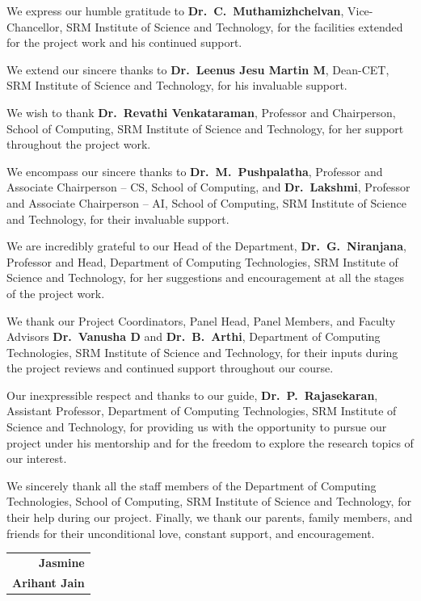\documentclass[12pt,a4paper,oneside]{report}
\begin{document}
\begin{singlespace}
We express our humble gratitude to \textbf{Dr.\ C.\ Muthamizhchelvan}, Vice-Chancellor, SRM Institute of Science and Technology, for the facilities extended for the project work and his continued support.

We extend our sincere thanks to \textbf{Dr.\ Leenus Jesu Martin M}, Dean-CET, SRM Institute of Science and Technology, for his invaluable support.

We wish to thank \textbf{Dr.\ Revathi Venkataraman}, Professor and Chairperson, School of Computing, SRM Institute of Science and Technology, for her support throughout the project work.

We encompass our sincere thanks to \textbf{Dr.\ M.\ Pushpalatha}, Professor and Associate Chairperson -- CS, School of Computing, and \textbf{Dr.\ Lakshmi}, Professor and Associate Chairperson -- AI, School of Computing, SRM Institute of Science and Technology, for their invaluable support.

We are incredibly grateful to our Head of the Department, \textbf{Dr.\ G.\ Niranjana}, Professor and Head, Department of Computing Technologies, SRM Institute of Science and Technology, for her suggestions and encouragement at all the stages of the project work.

We thank our Project Coordinators, Panel Head, Panel Members, and Faculty Advisors \textbf{Dr.\ Vanusha D} and \textbf{Dr.\ B.\ Arthi}, Department of Computing Technologies, SRM Institute of Science and Technology, for their inputs during the project reviews and continued support throughout our course.

Our inexpressible respect and thanks to our guide, \textbf{Dr.\ P.\ Rajasekaran}, Assistant Professor, Department of Computing Technologies, SRM Institute of Science and Technology, for providing us with the opportunity to pursue our project under his mentorship and for the freedom to explore the research topics of our interest.

We sincerely thank all the staff members of the Department of Computing Technologies, School of Computing, SRM Institute of Science and Technology, for their help during our project. Finally, we thank our parents, family members, and friends for their unconditional love, constant support, and encouragement.

\vspace{1.5em}
\begin{flushright}
\begin{tabular}{r}
\textbf{Jasmine} \quad [RA2211003010059]\\[0.4em]
\textbf{Arihant Jain} \quad [RA2211003010105]
\end{tabular}
\end{flushright}
\end{singlespace}
\end{document}
